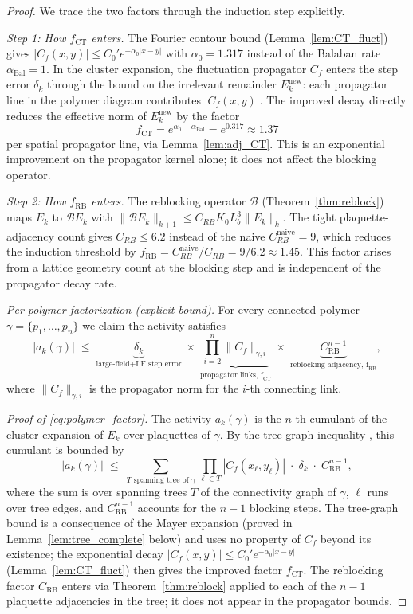 \documentclass[11pt,a4paper]{amsart}
\theoremstyle{definition}
\newcommand{\Cf}{C_f}
\newcommand{\CRB}{C_{\mathrm{RB}}}
\begin{document}
\begin{proof}
We trace the two factors through the induction step explicitly.

\textit{Step 1: How $f_{\mathrm{CT}}$ enters.}
The Fourier contour bound (Lemma~\ref{lem:CT_fluct}) gives
$|\Cf(x,y)| \le C_0' e^{-\alpha_0|x-y|}$ with $\alpha_0 = 1.317$
instead of the Balaban rate $\alpha_{\mathrm{Bal}} = 1$.
In the cluster expansion, the fluctuation propagator $\Cf$ enters the
step error $\delta_k$ through the bound on the irrelevant remainder
$E_k^{\mathrm{new}}$: each propagator line in the polymer diagram
contributes $|\Cf(x,y)|$.  The improved decay directly reduces the
effective norm of $E_k^{\mathrm{new}}$ by the factor
\[
  f_{\mathrm{CT}} = e^{\alpha_0 - \alpha_{\mathrm{Bal}}} = e^{0.317} \approx 1.37
\]
per spatial propagator line, via Lemma~\ref{lem:adj_CT}.
This is an exponential improvement on the propagator kernel alone;
it does not affect the blocking operator.

\textit{Step 2: How $f_{\mathrm{RB}}$ enters.}
The reblocking operator $\mathcal{B}$ (Theorem~\ref{thm:reblock}) maps
$E_k$ to $\mathcal{B}E_k$ with $\|\mathcal{B}E_k\|_{k+1} \le C_{RB} K_0 L_b^3 \|E_k\|_k$.
The tight plaquette-adjacency count gives $C_{RB} \le 6.2$ instead of
the naive $C_{RB}^{\mathrm{naive}} = 9$, which reduces the induction
threshold by $f_{\mathrm{RB}} = C_{RB}^{\mathrm{naive}}/C_{RB} = 9/6.2 \approx 1.45$.
This factor arises from a lattice geometry count at the blocking step
and is independent of the propagator decay rate.

\textit{Per-polymer factorization (explicit bound).}
For every connected polymer $\gamma = \{p_1,\ldots,p_n\}$ we claim the activity
satisfies
\begin{equation}
\label{eq:polymer_factor}
  |a_k(\gamma)|
  \;\le\;
  \underbrace{\delta_k}_{\text{large-field+LF step error}}
  \;\times\;
  \underbrace{\prod_{i=2}^{n} \|\Cf\|_{\gamma,i}}_{\text{propagator links, f}_{\mathrm{CT}}}
  \;\times\;
  \underbrace{\CRB^{n-1}}_{\text{reblocking adjacency, f}_{\mathrm{RB}}},
\end{equation}
where $\|\Cf\|_{\gamma,i}$ is the propagator norm for the $i$-th connecting link.

\textit{Proof of \eqref{eq:polymer_factor}.}
The activity $a_k(\gamma)$ is the $n$-th cumulant of the cluster expansion
of $E_k$ over plaquettes of $\gamma$.  By the
tree-graph inequality \cite[Prop.~2.3]{B87}, this cumulant is bounded by
\[
  |a_k(\gamma)|
  \;\le\; \sum_{T \text{ spanning tree of }\gamma}
  \prod_{\ell \in T} |\Cf(x_\ell, y_\ell)|
  \;\cdot\; \delta_k
  \;\cdot\; \CRB^{n-1},
\]
where the sum is over spanning trees $T$ of the connectivity graph of $\gamma$,
$\ell$ runs over tree edges, and $\CRB^{n-1}$ accounts for the $n-1$ blocking
steps.  The tree-graph bound is a consequence of the Mayer expansion
(proved in Lemma~\ref{lem:tree_complete} below)
and uses no property of $\Cf$ beyond its existence; the exponential decay
$|\Cf(x,y)| \le C_0' e^{-\alpha_0|x-y|}$ (Lemma~\ref{lem:CT_fluct}) then
gives the improved factor $f_{\mathrm{CT}}$.  The reblocking factor $\CRB$ enters
via Theorem~\ref{thm:reblock} applied to each of the $n-1$ plaquette
adjacencies in the tree; it does not appear in the propagator bounds.


\end{proof}
\end{document}
